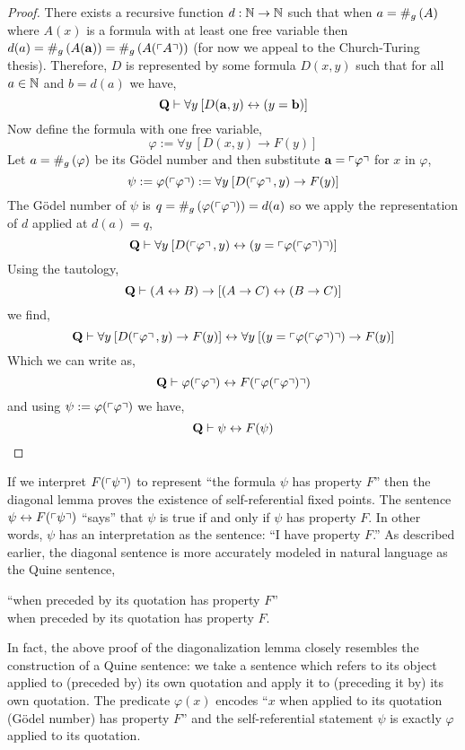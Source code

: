\documentclass[12pt]{article}
\newcommand{\uq}[1]{\forall{#1} \:}
\begin{document}
\begin{proof}
There exists a recursive function $d : \mathbb{N} \to \mathbb{N}$ such that when $a = \#_g\left( A \right)$ where $A(x)$ is a formula with at least one free variable then $d(a) = \#_g\left( A(\mathbf{a}) \right) = \#_g\left( A(\left\ulcorner A \right\urcorner) \right)$ (for now we appeal to the Church-Turing thesis). Therefore, $D$ is represented by some formula $D(x, y)$ such that for all $a \in \mathbb{N}$ and $b = d(a)$ we have,
\[ \bf{Q} \proves \uq{y} [ D(\bf{a}, y) \leftrightarrow (y = \bf{b}) ] \]
Now define the formula with one free variable,
\[ \varphi := \uq{y} [D(x, y) \to F(y) ] \]
Let $a = \#_g\left( \varphi \right)$ be its G\"{o}del number and then substitute $\mathbf{a} = \left\ulcorner \varphi \right\urcorner$ for $x$ in $\varphi$,
\[ \psi := \varphi(\Gterm{\varphi}) := \uq{y} [D(\Gterm{\varphi}, y) \to F(y)] \]
The G\"{o}del number of $\psi$ is $q = \#_g\left( \varphi(\left\ulcorner \varphi \right\urcorner) \right) = d(a)$ so we apply the representation of $d$ applied at $d(a) = q$,
\[ \bf{Q} \proves \uq{y} [D(\Gterm{\varphi}, y) \leftrightarrow (y = \Gterm{\varphi(\Gterm{\varphi})})] \] 
Using the tautology,
\[ \mathbf{Q} \vdash (A \leftrightarrow B) \to [(A \to C) \leftrightarrow (B \to C)] \]
we find,
\[ \bf{Q} \proves \uq{y} [D(\Gterm{\varphi}, y) \to F(y)] \leftrightarrow \uq{y} [(y = \Gterm{\varphi(\Gterm{\varphi})}) \to F(y)] \]
Which we can write as,
\[ \mathbf{Q} \vdash \varphi(\left\ulcorner \varphi \right\urcorner) \leftrightarrow F(\left\ulcorner \varphi(\left\ulcorner \varphi \right\urcorner) \right\urcorner) \]
and using $\psi := \varphi(\left\ulcorner \varphi \right\urcorner)$ we have,
\[ \mathbf{Q} \vdash \psi \leftrightarrow F(\psi) \] 
\end{proof}

\begin{remark}
If we interpret $F(\left\ulcorner \psi \right\urcorner)$ to represent ``the formula $\psi$ has property $F$'' then the diagonal lemma proves the existence of self-referential fixed points. The sentence $\psi \leftrightarrow F(\left\ulcorner \psi \right\urcorner)$ ``says'' that $\psi$ is true if and only if $\psi$ has property $F$. In other words, $\psi$ has an interpretation as the sentence: ``I have property $F$.'' 
As described earlier, the diagonal sentence is more accurately modeled in natural language as the Quine sentence,
\begin{center}
``when preceded by its quotation has property $F$''
\\ when preceded by its quotation has property $F$.
\end{center}
In fact, the above proof of the diagonalization lemma closely  resembles the construction of a Quine sentence: we take a sentence which refers to its object applied to (preceded by) its own quotation and apply it to (preceding it by) its own quotation. The predicate $\varphi(x)$ encodes ``$x$ when applied to its quotation (G\"{o}del number) has property $F$'' and the self-referential statement $\psi$ is exactly $\varphi$ applied to its quotation. 
\end{remark}
\end{document}
